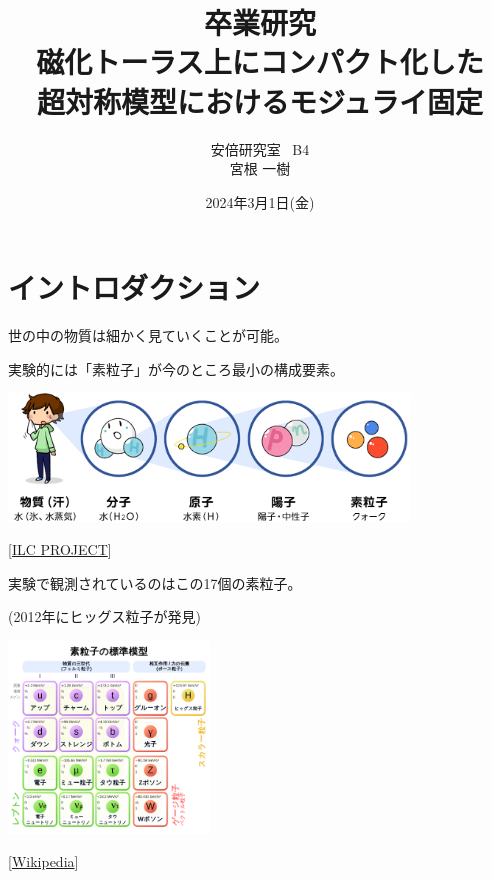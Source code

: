 \documentclass[
  unicode,a4paper,11pt,aspectratio=169,
  xcolor = {dvipsnames,svgnames},
  hyperref ={colorlinks=true,citecolor=Navy,linkcolor=NavyBlue,urlcolor=purple},
  ja=standard,lualatex
]{beamer}
\title{
  卒業研究
  \texorpdfstring{\\}{}
  \texorpdfstring{\vspace*{5pt}}{}
  {\LARGE
    磁化トーラス上にコンパクト化した
    \\
    超対称模型におけるモジュライ固定
  }
}
\author{
  安倍研究室 \ B4
  \texorpdfstring{\\}{}
  \texorpdfstring{\vspace*{3pt}}{}
  宮根 一樹
}
\date{2024年3月1日(金)}
\begin{document}
\begin{frame}
  \titlepage
\end{frame}


\section{イントロダクション}

\begin{frame}
  \huge \secname
\end{frame}

\begin{frame}
  世の中の物質は細かく見ていくことが可能。

  実験的には「素粒子」が今のところ最小の構成要素。

  \begin{center}
    \includegraphics[width=0.8\textwidth]{fig/ILCproject.png}       

    \vspace*{-5pt}
    { \small
      \hspace*{6cm}
      [\href{https://aaa-sentan.org/ILC/about_physics/anatomy01.html}{ILC PROJECT}]
    }   
  \end{center}

\end{frame}

\begin{frame}
  
  \begin{center}

    実験で観測されているのはこの17個の素粒子。
  
    (2012年にヒッグス粒子が発見)

    \includegraphics[width=0.4\textwidth]{fig/SM.png}  

    \vspace*{-15pt}
    { \small
      \hspace*{4cm}
      [\href{https://ja.wikipedia.org/wiki/標準模型}{Wikipedia}]
    }
  \end{center}

\end{frame}
\end{document}
